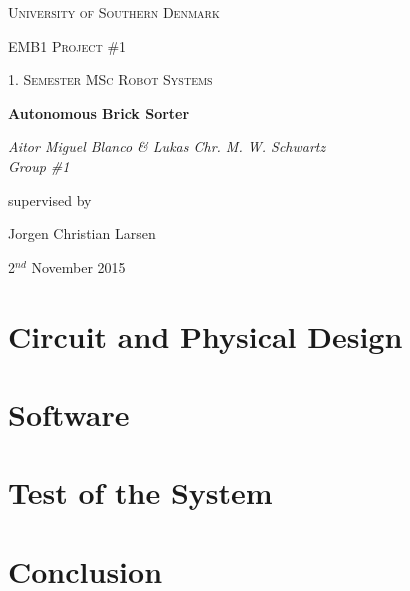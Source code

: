 \documentclass[12pt,a4paper]{article}
\begin{document}
\begin{titlepage}
	\centering
	\vfill
	{\scshape\LARGE University of Southern Denmark\par}
	\vspace{1cm}
	{\scshape\Large EMB1 Project \#1\par}
	{\scshape\large 1. Semester MSc Robot Systems\par}
	\vspace{1.5cm}
	{\huge\bfseries Autonomous Brick Sorter\par}
	\vspace{2cm}
	{\Large\itshape Aitor Miguel Blanco \& Lukas Chr. M. W. Schwartz \\ Group \#1 \par}
	\vfill
	supervised by\par
	Jorgen Christian Larsen

	\vspace{2cm}

	{\large 2$^{nd}$ November 2015 \par}
\end{titlepage}

\pagebreak

\tableofcontents

\pagebreak

\listoffigures

\listoftables

\pagebreak


\pagebreak


\section{Circuit and Physical Design}






\pagebreak
\section{Software}








\pagebreak
\section{Test of the System}


\pagebreak
\section{Conclusion}

\end{document}
